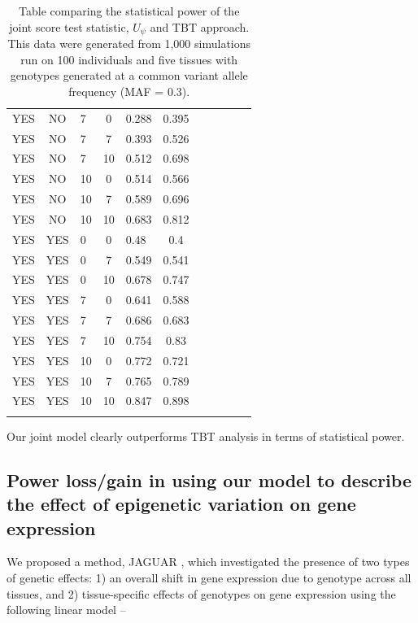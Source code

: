 \documentclass[hidelinks]{article}
\begin{document}
\begin{longtable}{lclclclclcl}
YES & NO & 7 & 0 & 0.288 & 0.395 \\
YES & NO & 7 & 7 & 0.393 & 0.526 \\
YES & NO & 7 & 10 & 0.512 & 0.698 \\
YES & NO & 10 & 0 & 0.514 & 0.566 \\
YES & NO & 10 & 7 & 0.589 & 0.696 \\
YES & NO & 10 & 10 & 0.683 & 0.812 \\ \hdashline
YES & YES & 0 & 0 & 0.48 & 0.4 \\
YES & YES & 0 & 7 & 0.549 & 0.541 \\
YES & YES & 0 & 10 & 0.678 & 0.747 \\
YES & YES & 7 & 0 & 0.641 & 0.588 \\
YES & YES & 7 & 7 & 0.686 & 0.683 \\
YES & YES & 7 & 10 & 0.754 & 0.83 \\
YES & YES & 10 & 0 & 0.772 & 0.721 \\
YES & YES & 10 & 7 & 0.765 & 0.789 \\
YES & YES & 10 & 10 & 0.847 & 0.898 \\
\hline \hline
\caption{Table comparing the statistical power of the joint score test statistic, $U_\psi$ and TBT approach. This data were generated from 1,000 simulations run on 100 individuals and five tissues with genotypes generated at a common variant allele frequency (MAF = 0.3).}
\end{longtable}

Our joint model clearly outperforms TBT analysis in terms of statistical power.

\subsection{Power loss/gain in using our model to describe the effect of epigenetic variation on gene expression}

We proposed a method, JAGUAR \cite{jaguar}, which investigated the presence of two types of genetic effects: 1) an overall shift in gene expression due to genotype across all tissues, and 2) tissue-specific effects of genotypes on gene expression using the following linear model --
\end{document}
